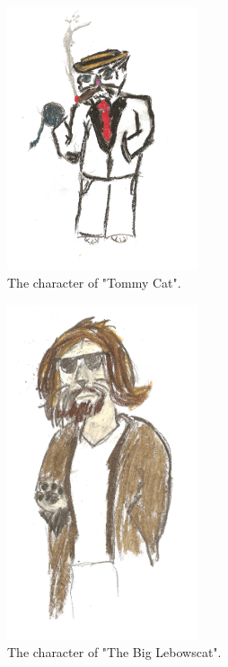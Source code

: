 \documentclass[12pt]{IEEEtran}
\begin{document}
	\begin{figure}[h]
		\centering
		\includegraphics[width=0.5\textwidth]{tommy_cat.jpg}
		\caption{The character of "Tommy Cat".}
		\label{fig:tommy}
	\end{figure}
	
	\begin{figure}[h]
		\centering
		\includegraphics[width=0.5\textwidth]{lebowski_cat.jpg}
		\caption{The character of "The Big Lebowscat".}
		\label{fig:lebowscat}
	\end{figure}
\end{document}
